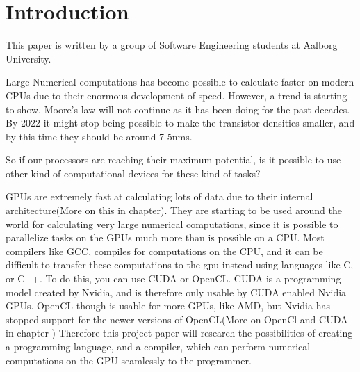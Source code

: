 \chapter{Introduction}\label{ch:introduction}

This paper is written by a group of Software Engineering students at Aalborg University.

Large Numerical computations has become possible to calculate faster on modern CPUs due to their enormous development of speed. 
However, a trend is starting to show, Moore's law will not continue as it has been doing for the past decades.
By 2022 it might stop being possible to make the transistor densities smaller, and by this time they should be around 7-5nms.\citep{Moore2013}


So if our processors are reaching their maximum potential, is it possible to use other kind of computational devices for these kind of tasks?

GPUs are extremely fast at calculating lots of data due to their internal architecture(More on this in chapter).
They are starting to be used around the world for calculating very large numerical computations, since it is possible to parallelize tasks on the GPUs much more than is possible on a CPU.
Most compilers like GCC, compiles for computations on the CPU, and it can be difficult to transfer these computations to the gpu instead using languages like C, or C++.
To do this, you can use CUDA or OpenCL.
CUDA is a programming model created by Nvidia, and is therefore only usable by CUDA enabled Nvidia GPUs.
OpenCL though is usable for more GPUs, like AMD, but Nvidia has stopped support for the newer versions of OpenCL(More on OpenCl and CUDA in chapter )
Therefore this project paper will research the possibilities of creating a programming language, and a compiler, which can perform numerical computations on the GPU seamlessly to the programmer. 